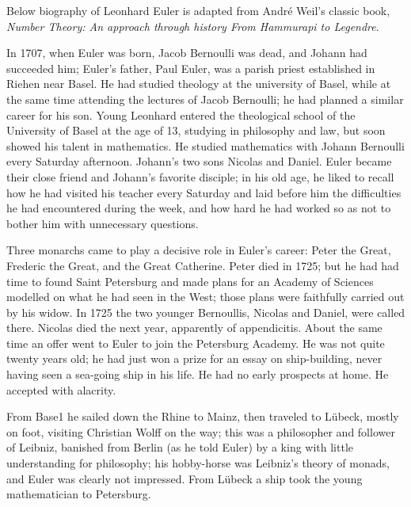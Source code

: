\documentclass[b5paper]{article}
\begin{document}
\begin{mdframed}
Below biography of Leonhard Euler is adapted from André Weil's classic book, \emph{Number Theory: An approach through history From Hammurapi to Legendre}.

In 1707, when Euler was born, Jacob Bernoulli was dead, and Johann had succeeded him; Euler's father, Paul Euler, was a parish priest established in Riehen near Basel. He had studied theology at the university of Basel, while at the same time attending the lectures of Jacob Bernoulli; he had planned a similar career for his son. Young Leonhard entered the theological school of the University of Basel at the age of 13, studying in philosophy and law, but soon showed his talent in mathematics. He studied mathematics with Johann Bernoulli every Saturday afternoon. Johann's two sons Nicolas and Daniel. Euler became their close friend and Johann's favorite disciple; in his old age, he liked to recall how he had visited his teacher every Saturday and laid before him the difficulties he had encountered during the week, and how hard he had worked so as not to bother him with unnecessary questions.

Three monarchs came to play a decisive role in Euler's career: Peter the Great, Frederic the Great, and the Great Catherine. Peter died in 1725; but he had had time to found Saint Petersburg and made plans for an Academy of Sciences modelled on what he had seen in the West; those plans were faithfully carried out by his widow. In 1725 the two younger Bernoullis, Nicolas and Daniel, were called there. Nicolas died the next year, apparently of appendicitis. About the same time an offer went to Euler to join the Petersburg Academy. He was not quite twenty years old; he had just won a prize for an essay on ship-building, never having seen a sea-going ship in his life. He had no early prospects at home. He accepted with alacrity.

From Base1 he sailed down the Rhine to Mainz, then traveled to Lübeck, mostly on foot, visiting Christian Wolff on the way; this was a philosopher and follower of Leibniz, banished from Berlin (as he told Euler) by a king with little understanding for philosophy; his hobby-horse was Leibniz's theory of monads, and Euler was clearly not impressed. From Lübeck a ship took the young mathematician to Petersburg.


\end{mdframed}
\end{document}
